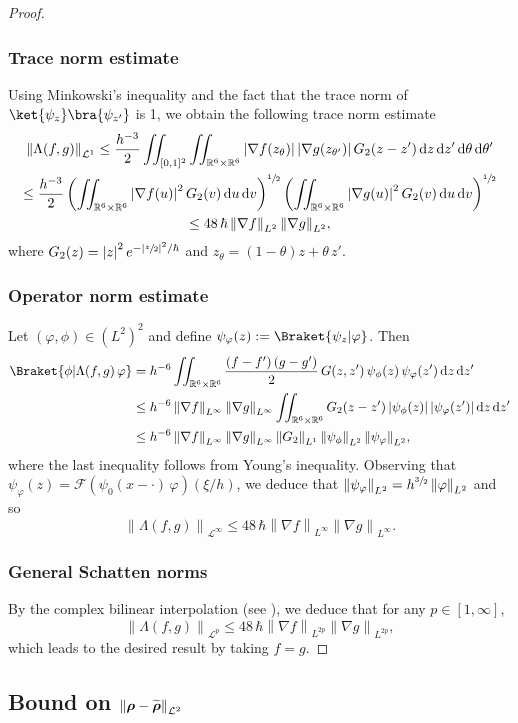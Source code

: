 \documentclass[10pt]{amsart}
\newcommand {\an}[1] {\lvert #1\rvert}
\theoremstyle{definition}
\newcommand{\step}[1] {\subsubsection*{#1}}
\newcommand {\RR} {\mathbb R}
\newcommand {\RRd} {\RR^6}
\renewcommand {\L} {\mathcal L}
\newcommand {\ecF} {\mathscr{F}}
\let\lt\left
\let\rt\right
\renewcommand {\(} {\lt(}
\renewcommand {\)} {\rt)}
\newcommand {\n}[1] {\lt\lvert #1 \rt\rvert}
\newcommand {\nrm}[1] {\lt\lVert #1\rt\rVert}
\newcommand {\Nrm}[2] {\nrm{#1}_{#2}}
\renewcommand {\d} {\mathop{}\!\mathrm{d}}
\newcommand {\F}[1] {\ecF\!\( #1 \)}
\newcommand {\iintdd} {\iint_{\RRd\times\RRd}}
\newcommand {\Inprod}[2] {\Braket{#1 | #2}}
\newcommand {\op} {\boldsymbol{\rho}}
\begin{document}
\begin{proof}
\step{Trace norm estimate} Using Minkowski's inequality and the fact that the trace norm of $\ket{\psi_{z}}\bra{\psi_{z'}}$ is 1, we obtain the following trace norm estimate
\begin{multline*}
\Nrm{\Lambda(f,g)}{\L^1} \leq \frac{h^{-3}}{2} \iint_{[0,1]^2}\iintdd \n{\nabla f(z_\theta)} \n{\nabla g(z_{\theta'})} G_2(z-z') \d z \d z' \d \theta\d \theta'
\\
\leq \frac{h^{-3}}{2} \(\iintdd \n{\nabla f(u)}^2 G_2(v) \d u \d v\)^{\sfrac{1}{2}} \(\iintdd \n{\nabla g(u)}^2 G_2(v) \d u \d v\)^{\sfrac{1}{2}}
\\
\leq 48\,\hbar \Nrm{\nabla f}{L^2} {\Nrm{\nabla g}{L^2}},
\end{multline*}
where $G_2(z) = \n{z}^2 e^{-\an{\sfrac{z}{2}}^2/\hbar}$ and $z_\theta = \(1-\theta\) z + \theta\, z'$.
\step{Operator norm estimate} Let $(\varphi,\phi)\in (L^2)^2$ and define $\psi_\varphi(z) := \Inprod{\psi_z}{\varphi}$. Then
\begin{align*}
\Inprod{\phi}{\Lambda(f,g)\,\varphi} &= h^{-6} \iintdd \frac{\(f-f'\)\(g-g'\)}{2} \,G(z,z') \, \psi_{\phi}(z)\,\psi_{\varphi}(z') \d z \d z'
\\
&\leq h^{-6} \Nrm{\nabla f}{L^{\infty}}\Nrm{\nabla g}{L^{\infty}}\iintdd G_2(z-z') \n{\psi_{\phi}(z)}\n{\psi_{\varphi}(z')} \d z \d z'
\\
&\leq h^{-6} \Nrm{\nabla f}{L^{\infty}}\Nrm{\nabla g}{L^{\infty}}\Nrm{G_2}{L^1} \Nrm{\psi_{\phi}}{L^2}{\Nrm{\psi_{\varphi}}{L^2}},
\end{align*}
where the last inequality follows from Young's inequality. Observing that $\psi_\varphi(z) = \F{\psi_0(x-\cdot)\,\varphi}(\xi/h)$, we deduce that $\Nrm{\psi_\varphi}{L^2} = h^{\sfrac32} \Nrm{\varphi}{L^2}$ and so
\begin{equation*}
\Nrm{\Lambda(f,g)}{\L^\infty} \leq 48\,\hbar \Nrm{\nabla f}{L^{\infty}}{\Nrm{\nabla g}{L^{\infty}}}.
\end{equation*}

\step{General Schatten norms} By the complex bilinear interpolation (see \eg \cite[\S 4.4]{bergh_interpolation_1976}), we deduce that for any $p\in [1,\infty]$,
\begin{equation*}
\Nrm{\Lambda(f,g)}{\L^p} \leq 48\,\hbar \Nrm{\nabla f}{L^{2p}}{\Nrm{\nabla g}{L^{2p}}},
\end{equation*}
which leads to the desired result by taking $f=g$.
\end{proof}

\subsection{Bound on \texorpdfstring{$\Nrm{\op-\protect\widetilde{\op}}{\L^2}$}{auxiliary and Hartree} }\label{sec:op-opt}
\end{document}
